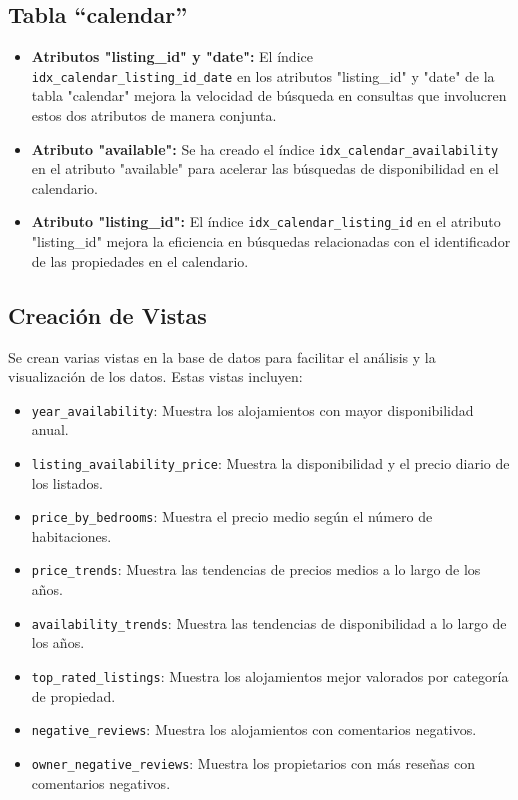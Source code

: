 \subsection*{Tabla ``calendar''}


\begin{itemize}
  \item \textbf{Atributos "listing\_id" y "date":} El índice \\ \texttt{idx\_calendar\_listing\_id\_date} en los atributos "listing\_id" y "date" de la tabla "calendar" mejora la velocidad de búsqueda en consultas que involucren estos dos atributos de manera conjunta.
  \item \textbf{Atributo "available":} Se ha creado el índice \texttt{idx\_calendar\_availability} en el atributo "available" para acelerar las búsquedas de disponibilidad en el calendario.
  \item \textbf{Atributo "listing\_id":} El índice \texttt{idx\_calendar\_listing\_id} en el atributo "listing\_id" mejora la eficiencia en búsquedas relacionadas con el identificador de las propiedades en el calendario.
\end{itemize}

\subsection{Creación de Vistas}

Se crean varias vistas en la base de datos para facilitar el análisis y la visualización de los datos. Estas vistas incluyen:

\begin{itemize}
    \item \texttt{year\_availability}: Muestra los alojamientos con mayor disponibilidad anual.
    \item \texttt{listing\_availability\_price}: Muestra la disponibilidad y el precio diario de los listados.
    \item \texttt{price\_by\_bedrooms}: Muestra el precio medio según el número de habitaciones.
    \item \texttt{price\_trends}: Muestra las tendencias de precios medios a lo largo de los años.
    \item \texttt{availability\_trends}: Muestra las tendencias de disponibilidad a lo largo de los años.
    \item \texttt{top\_rated\_listings}: Muestra los alojamientos mejor valorados por categoría de propiedad.
    \item \texttt{negative\_reviews}: Muestra los alojamientos con comentarios negativos.
    \item \texttt{owner\_negative\_reviews}: Muestra los propietarios con más reseñas con comentarios negativos.
\end{itemize}
\newpage
